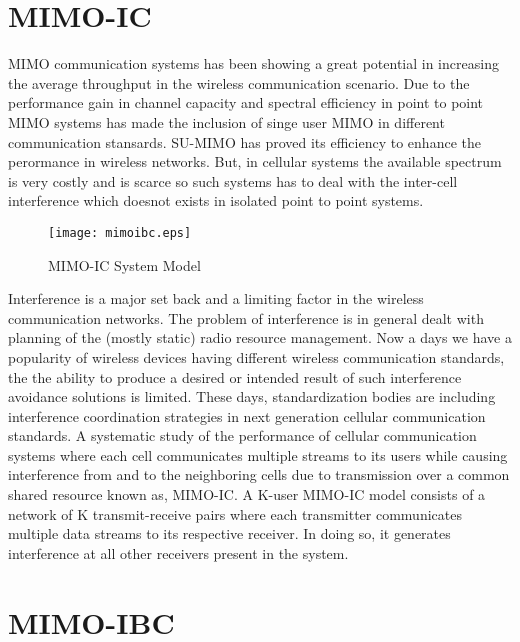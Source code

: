 \section{MIMO-IC}
\ac{MIMO} communication systems has been showing a great potential in increasing the average throughput in the wireless communication scenario. Due to the performance gain in channel capacity and spectral efficiency in point to point \ac{MIMO} systems has made the inclusion of singe user \ac{MIMO} in different communication stansards. SU-\ac{MIMO} has proved its efficiency to enhance the perormance in wireless networks. But, in cellular systems the available spectrum is very costly and is scarce so such systems has to deal with the inter-cell interference which doesnot exists in isolated point to point systems.

\begin{figure}[h]
	\begin{center}
		\texttt{[image: mimoibc.eps]}
		\caption{MIMO-IC System Model}
	\end{center}
\end{figure}

Interference is a major set back and a limiting factor in the wireless communication networks. The problem of interference is in general  dealt  with  planning of the  (mostly  static) radio resource management. Now a days we have a popularity of wireless  devices  having  different  wireless  communication standards, the the ability to produce a desired or intended result of such interference avoidance solutions is limited. These days, standardization bodies are including  interference coordination strategies in  next generation  cellular  communication standards.  A  systematic study  of  the  performance of  cellular  communication systems where  each  cell  communicates  multiple  streams to  its  users while causing interference from and to the neighboring cells due  to  transmission  over  a  common  shared  resource  known as, \ac{MIMO}-\ac{IC}. A K-user \ac{MIMO}-\ac{IC} model consists of a network of K transmit-receive  pairs  where each transmitter  communicates  multiple data streams to its respective receiver. In doing so, it generates interference at all other receivers present in the system.



\section{MIMO-IBC}

